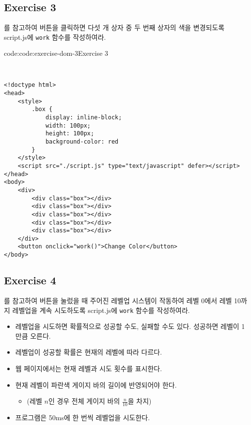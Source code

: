 \subsection*{Exercise 3}

를 참고하여 버튼을 클릭하면 다섯 개 상자 중 두 번째 상자의 색을 변경되도록 script.js에 \texttt{work} 함수를 작성하여라.

\begin{codeenv}{code:code:exercise-dom-3}{Exercise 3}\begin{verbatim}


<!doctype html>
<head>
    <style>
        .box { 
            display: inline-block; 
            width: 100px; 
            height: 100px; 
            background-color: red 
        }
    </style>
    <script src="./script.js" type="text/javascript" defer></script>
</head>
<body>
    <div>
        <div class="box"></div>
        <div class="box"></div>
        <div class="box"></div>
        <div class="box"></div>
        <div class="box"></div>
    </div>
    <button onclick="work()">Change Color</button>
</body>
\end{verbatim}
\end{codeenv}

\subsection*{Exercise 4}

를 참고하여 버튼을 눌렀을 때 주어진 레벨업 시스템이 작동하여 레벨 0에서 레벨 10까지 레벨업을 계속 시도하도록 script.js에 \texttt{work} 함수를 작성하여라.

\begin{itemize}
    \item 레벨업을 시도하면 확률적으로 성공할 수도, 실패할 수도 있다. 성공하면 레벨이 1만큼 오른다.
    \item 레벨업이 성공할 확률은 현재의 레벨에 따라 다르다.
    \item 웹 페이지에서는 현재 레벨과 시도 횟수를 표시한다.
    \item 현재 레벨이 파란색 게이지 바의 길이에 반영되어야 한다. 
    \begin{itemize}
        \item (레벨 $n$인 경우 전체 게이지 바의 $\frac n {10}$을 차지)
    \end{itemize}
    \item 프로그램은 50ms에 한 번씩 레벨업을 시도한다.
\end{itemize}

